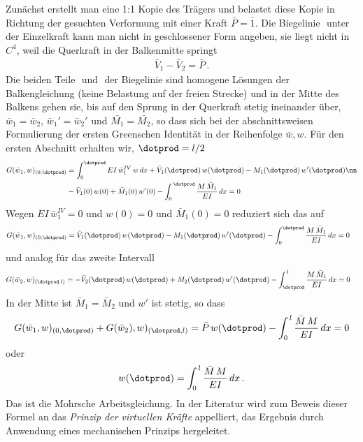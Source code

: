 Zun\"{a}chst erstellt man eine 1:1 Kopie des Tr\"{a}gers und belastet diese Kopie in Richtung der gesuchten Verformung mit einer Kraft $\bar{P} = \bar{1} $. Die Biegelinie $ $ unter der Einzelkraft kann man nicht in geschlossener Form angeben, sie liegt nicht in $C^4$, weil die Querkraft in der Balkenmitte springt
\begin{align}
\bar{V}_1 - \bar{V}_2 = \bar{P}\,.
\end{align}
Die beiden Teile $ $ und $ $ der Biegelinie sind homogene L\"{o}sungen der Balkengleichung (keine Belastung auf der freien Strecke) und in der Mitte des Balkens gehen sie, bis auf den Sprung in der Querkraft stetig ineinander \"{u}ber, $\bar{w}_1 = \bar{w}_2$, $\bar{w}_1' = \bar{w}_2'$ und $\bar{M_1} = \bar{M_2}$, so dass sich bei der abschnittsweisen Formulierung der ersten Greenschen Identit\"{a}t in der Reihenfolge $\bar{w},w $. F\"{u}r den ersten Abschnitt erhalten wir, $\dotprod = l/2$
\begin{align}
G(\bar{w}_1,w)_{(0,\dotprod)} &= \int_0^{\dotprod} EI\,\bar{w}_1^{IV}\,w\,dx + \bar{V}_1(\dotprod)\,w(\dotprod) - M_1(\dotprod)\,w'(\dotprod)\nn \\
 &- \bar{V}_1(0)\,w(0) + \bar{M}_1(0)\,w'(0) - \int_0^{\,\dotprod} \frac{M\,\bar{M}_1}{EI}\,dx = 0
\end{align}
Wegen $EI\,\bar{w}_1^{IV} = 0$ und $w(0) = 0$ und $\bar{M}_1(0) = 0$ reduziert sich das auf
\begin{align}
G(\bar{w}_1,w)_{(0,\dotprod)} &= \bar{V}_1(\dotprod)\,w(\dotprod) - M_1(\dotprod)\,w'(\dotprod)  - \int_0^{\dotprod} \frac{M\,\bar{M}_1}{EI}\,dx = 0
\end{align}
und analog f\"{u}r das zweite Intervall
\begin{align}
G(\bar{w}_2,w)_{(\dotprod,l)} &= -\bar{V}_2(\dotprod)\,w(\dotprod) + M_2(\dotprod)\,w'(\dotprod)  - \int_{\dotprod}^{\,l} \frac{M\,\bar{M}_1}{EI}\,dx = 0
\end{align}
In der Mitte ist $\bar{M}_1 = \bar{M}_2$ und $w'$ ist stetig, so dass
\begin{align}
G(\bar{w}_1,w)_{(0,\dotprod)} + G(\bar{w}_2),w)_{(\dotprod,l)} = \bar{P}\,w(\dotprod) - \int_0^{\,l} \frac{\bar{M}\,M}{EI}\,dx = 0
\end{align}
oder
\begin{align}
w(\dotprod) =  \int_0^{\,l} \frac{\bar{M}\,M}{EI}\,dx\,.
\end{align}
Das ist die Mohrsche Arbeitsgleichung. In der Literatur wird zum Beweis dieser Formel an das {\em Prinzip der virtuellen Kr\"{a}fte\/} appelliert, das Ergebnis durch Anwendung eines mechanischen Prinzips hergeleitet.

